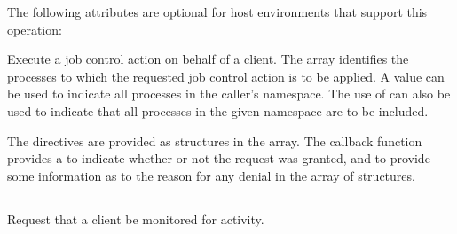 \reqattrend

\optattrstart
The following attributes are optional for host environments that support this operation:


\optattrend

\descr

Execute a job control action on behalf of a client. The  array identifies the processes to which the requested job control action is to be applied.
A  value can be used to indicate all processes in the caller's namespace.
The use of  can also be used to indicate that all processes in the given namespace are to be included.

The directives are provided as  structures in the  array.
The callback function provides a  to indicate whether or not the request was granted, and to provide some information as to the reason for any denial in the  array of  structures.


\subsection{}

\summary

Request that a client be monitored for activity.

\format


